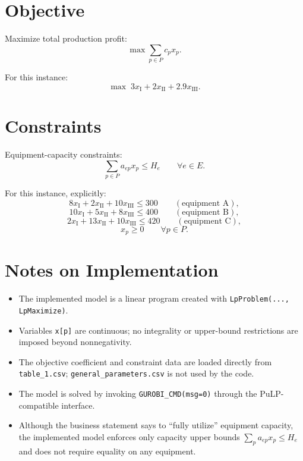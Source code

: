 \section*{Objective}

Maximize total production profit:
\[
\max \sum_{p\in P} c_p x_p.
\]

For this instance:
\[
\max \; 3x_{\text{I}} + 2x_{\text{II}} + 2.9x_{\text{III}}.
\]

\section*{Constraints}

Equipment-capacity constraints:
\[
\sum_{p\in P} a_{ep} x_p \le H_e \qquad \forall e\in E.
\]

For this instance, explicitly:
\[
8x_{\text{I}} + 2x_{\text{II}} + 10x_{\text{III}} \le 300 \qquad (\text{equipment A}),
\]
\[
10x_{\text{I}} + 5x_{\text{II}} + 8x_{\text{III}} \le 400 \qquad (\text{equipment B}),
\]
\[
2x_{\text{I}} + 13x_{\text{II}} + 10x_{\text{III}} \le 420 \qquad (\text{equipment C}),
\]
\[
x_p \ge 0 \qquad \forall p\in P.
\]

\section*{Notes on Implementation}

\begin{itemize}
    \item The implemented model is a linear program created with \texttt{LpProblem(..., LpMaximize)}.
    \item Variables \texttt{x[p]} are continuous; no integrality or upper-bound restrictions are imposed beyond nonnegativity.
    \item The objective coefficient and constraint data are loaded directly from \texttt{table\_1.csv}; \texttt{general\_parameters.csv} is not used by the code.
    \item The model is solved by invoking \texttt{GUROBI\_CMD(msg=0)} through the PuLP-compatible interface.
    \item Although the business statement says to ``fully utilize'' equipment capacity, the implemented model enforces only capacity upper bounds $\sum_{p} a_{ep}x_p \le H_e$ and does not require equality on any equipment.
\end{itemize}
